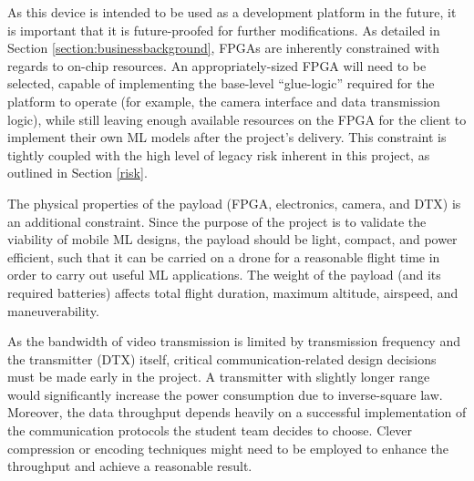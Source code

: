 \documentclass[10pt,letterpaper]{article}
\begin{document}
As this device is intended to be used as a development platform in the future, it is important that it is future-proofed for further modifications. As detailed in Section \ref{section:businessbackground}, FPGAs are
inherently constrained with regards to on-chip resources. An appropriately-sized FPGA will need to be selected, capable of
implementing the base-level ``glue-logic'' required for the platform to operate (for example, the camera interface and data transmission logic), while still
leaving enough available resources on the FPGA for the client to implement their own ML models after the project's delivery. 
This constraint is tightly coupled with the high level of legacy risk inherent in this project, as outlined in Section \ref{risk}.

The physical properties of the payload (FPGA, electronics, camera, and  DTX) is an additional constraint. Since the purpose of the project
is to validate the viability of mobile ML designs, the payload should be light, compact, and power efficient, such
that it can be carried on a drone for a reasonable flight time in order to carry out useful ML applications.
The weight of the payload (and its required batteries) affects total flight duration, maximum altitude, airspeed, and maneuverability. 

As the bandwidth of video transmission is limited by transmission frequency and the transmitter (DTX) itself, 
critical communication-related design decisions must be made early in the project.
A transmitter with slightly longer range would significantly increase the power consumption due to inverse-square law.
Moreover, the data throughput depends heavily on a successful implementation of the communication
protocols the student team decides to choose. Clever compression or encoding techniques might need to be
employed to enhance the throughput and achieve a reasonable result.



\clearpage
{}



\end{document}

